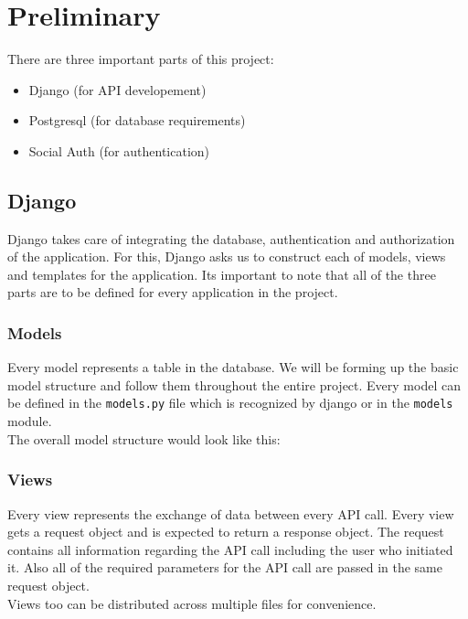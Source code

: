 \chapter{\textbf{Preliminary}}
There are three important parts of this project:
\begin{itemize}
    \item Django (for API developement)
    \item Postgresql (for database requirements)
    \item Social Auth (for authentication)
\end{itemize}

\section{\textbf{Django}}
Django takes care of integrating the database, authentication and authorization
of the application. For this, Django asks us to construct each of models, views
and templates for the application. Its important to note that all of the three
parts are to be defined for every application in the project.

\subsection{\textbf{Models}}
Every model represents a table in the database. We will be forming up the
basic model structure and follow them throughout the entire project.
Every model can be defined in the \texttt{models.py} file which is recognized
by django or in the \texttt{models} module.\\
The overall model structure would look like this:\\


\subsection{\textbf{Views}}
Every view represents the exchange of data between every API call. Every view
gets a request object and is expected to return a response object. The request
contains all information regarding the API call including the user who
initiated it. Also all of the required parameters for the API call are passed
in the same request object.\\
Views too can be distributed across multiple files for convenience.

